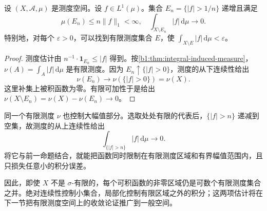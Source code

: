 \begin{proposition}\label{b1:prop:integrable-localization}
设 \((X,\mathcal A,\mu)\) 是测度空间。设 \(f\in L^1(\mu)\)。集合 \(E_n=\{|f|>1/n\}\) 递增且满足
\[
\mu(E_n)\leq n\|f\|_1<\infty,
\quad
\int_{X\setminus E_n}|f|\,\mathrm d\mu\longrightarrow0.
\]
特别地，对每个 \(\varepsilon>0\)，可以找到有限测度集合 \(E\)，使 \(\int_{X\setminus E}|f|\,\mathrm d\mu<\varepsilon\)。
\end{proposition}
\begin{proof}
测度估计由 \(n^{-1}\cdot\mathbf1_{E_n}\leq|f|\) 得到。按\cref{b1:thm:integral-induced-measure}，\(\nu(A)=\int_A|f|\,\mathrm d\mu\) 是有限测度。因为 \(E_n\uparrow\{|f|>0\}\)，测度的从下连续性给出
\[
\nu(E_n)\longrightarrow\nu(\{|f|>0\})=\nu(X).
\]
这里补集上被积函数为零。有限可加性于是给出 \(\nu(X\setminus E_n)=\nu(X)-\nu(E_n)\to0\)。
\end{proof}

同一个有限测度 \(\nu\) 也控制大幅值部分。选取处处有限的代表后，\(\{|f|>n\}\) 递减到空集，故测度的从上连续性给出
\[
\int_{\{|f|>n\}}|f|\,\mathrm d\mu\longrightarrow0.
\]
将它与前一命题结合，就能把函数同时限制在有限测度区域和有界幅值范围内，且只损失任意小的积分误差。

\ProseParagraphBreak

因此，即使 \(X\) 不是 \(\sigma\)-有限的，每个可积函数的非零区域仍是可数个有限测度集合之并。绝对连续性控制小集合，局部化控制有限区域之外的积分；这两项估计将在下一节把有限测度空间上的收敛论证推广到一般空间。
